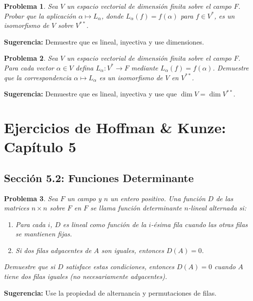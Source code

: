 \documentclass[12pt,a4paper]{article}
\newtheorem{problem}{Problema}
\newenvironment{suggestion}{\par\noindent\textbf{Sugerencia: }}{}
\begin{document}
\begin{problem}
Sea $V$ un espacio vectorial de dimensión finita sobre el campo $F$. Probar que la aplicación $\alpha\mapsto L_\alpha$, donde $L_\alpha(f)=f(\alpha)$ para $f\in V^*$, es un isomorfismo de $V$ sobre $V^{**}$.
\end{problem}
\begin{suggestion}
Demuestre que es lineal, inyectiva y use dimensiones.
\end{suggestion}

\begin{problem}
Sea $V$ un espacio vectorial de dimensión finita sobre el campo $F$. Para cada vector $\alpha\in V$ defina $L_\alpha:V^*\to F$ mediante $L_\alpha(f)=f(\alpha)$. Demuestre que la correspondencia $\alpha\mapsto L_\alpha$ es un isomorfismo de $V$ en $V^{**}$.
\end{problem}
\begin{suggestion}
Demuestre que es lineal, inyectiva y use que $\dim V = \dim V^{**}$.
\end{suggestion}

\section{Ejercicios de Hoffman \& Kunze: Capítulo 5}

\subsection{Sección 5.2: Funciones Determinante}

\begin{problem}
Sea $F$ un campo y $n$ un entero positivo. Una función $D$ de las matrices $n\times n$ sobre $F$ en $F$ se llama \emph{función determinante $n$-lineal alternada} si:
\begin{enumerate}
\item Para cada $i$, $D$ es lineal como función de la $i$-ésima fila cuando las otras filas se mantienen fijas.
\item Si dos filas adyacentes de $A$ son iguales, entonces $D(A)=0$.
\end{enumerate}
Demuestre que si $D$ satisface estas condiciones, entonces $D(A)=0$ cuando $A$ tiene dos filas iguales (no necesariamente adyacentes).
\end{problem}
\begin{suggestion}
Use la propiedad de alternancia y permutaciones de filas.
\end{suggestion}
\end{document}
